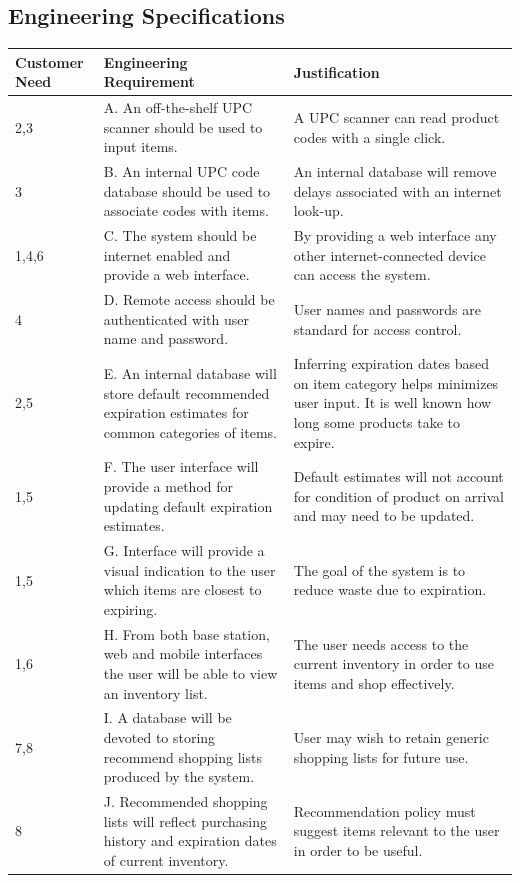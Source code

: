 \documentclass[11pt]{article} %
\begin{document}
\subsection{Engineering Specifications}
\begin{table}[h!]
\begin{center}
\begin{tabular}{| p{1.2in} | p{2.5in} |p{2.5in} |}
\hline
Customer Need & Engineering Requirement & Justification \\
\hline
2,3 &A. An off-the-shelf UPC scanner should be used to input items. & A UPC scanner can read product codes with a single click.\\
\hline
3 &B. An internal UPC code database should be used to associate codes with items.&An internal database will remove delays associated with an internet look-up.\\
\hline
1,4,6&C. The system should be internet enabled and provide a web interface.&By providing a web interface any other internet-connected device can access the system.\\
\hline
4&D. Remote access should be authenticated with user name and password.&User names and passwords are standard for access control.\\
\hline
2,5&E. An internal database will store default recommended expiration estimates for common categories of items.&Inferring expiration dates based on item category helps minimizes user input. It is well known how long some products take to expire.\\
\hline
1,5&F. The user interface will provide a method for updating default expiration estimates.&Default estimates will not account for condition of product on arrival and may need to be updated.\\
\hline
1,5&G. Interface will provide a visual indication to the user which items are closest to expiring.&The goal of the system is to reduce waste due to expiration.\\
\hline
1,6&H. From both base station, web and mobile interfaces the user will be able to view an inventory list.&The user needs access to the current inventory in order to use items and shop effectively.\\
\hline
7,8&I. A database will be devoted to storing recommend shopping lists produced by the system.&User may wish to retain generic shopping lists for future use.\\
\hline
8&J. Recommended shopping lists will reflect purchasing history and expiration dates of current inventory.&Recommendation policy must suggest items relevant to the user in order to be useful.\\

\end{tabular}
\end{center}
\end{table}
\end{document}
